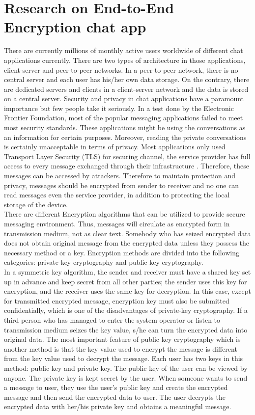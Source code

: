 \section{Research on End-to-End Encryption chat app}
There are currently millions of monthly active users worldwide of different chat applications currently. There are two types of architecture in those applications, client-server and peer-to-peer networks. In a peer-to-peer network, there is no central server and each user has his/her own data storage. On the contrary, there are dedicated servers and clients in a client-server network and the data is stored on a central server. Security and privacy in chat applications have a paramount importance but few people take it seriously. In a test done by the Electronic Frontier Foundation, most of the popular messaging applications failed to meet most security standards. These applications might be using the conversations as an information for certain purposes. Moreover, reading the private conversations is certainly unacceptable in terms of privacy.  Most applications only used Transport Layer Security (TLS) for securing channel, the service provider has full access to every message exchanged through their infrastructure . Therefore, these messages can be accessed by attackers. Therefore to maintain protection and privacy, messages should be encrypted from sender to receiver and no one can read messages even the service provider, in addition to protecting the local storage of the device.\\
There are different Encryption algorithms that can  be utilized  to  provide secure  messaging environment. Thus, messages will circulate as  encrypted form in transmission medium, not as clear text. Somebody who has seized encrypted data does not obtain original message from the encrypted  data  unless they  possess  the  necessary  method or  a  key.  Encryption  methods  are divided into the following categories: private key cryptography and public key cryptography.\\
In a symmetric key algorithm, the sender and receiver must have a shared key set up in advance and keep secret from all other parties; the sender uses this key for encryption, and the receiver uses  the  same  key  for  decryption.  In  this  case,  except  for  transmitted  encrypted  message, encryption  key  must  also  be  submitted  confidentially,  which  is  one  of  the  disadvantages of private-key cryptography.
If a third person who has managed to enter the system operator or listen to transmission medium
seizes the  key value,  s/he can turn  the  encrypted data into  original data.  The most  important feature of public key cryptography which is another method is that the key value used to encrypt the message is different from the key value used to decrypt the message. Each user has two keys
in this method: public key and private key. The public key of the user can be viewed by anyone.
The private key is kept secret by the user. When someone wants to send a message to user, they
use the user's public key and create the encrypted message and then send the encrypted data to
user. The user  decrypts the  encrypted data with  her/his private  key  and obtains  a meaningful
message.\cite{Sabah2017}\\
